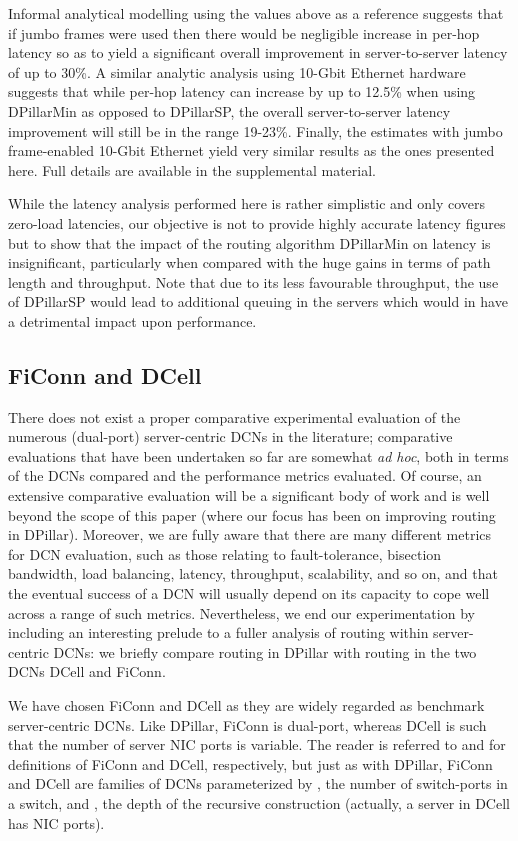 \documentclass{article}
\newcounter{fig}
\begin{document}
Informal analytical modelling using the values above as a reference suggests that if jumbo frames were used then there would be negligible increase in per-hop latency so as to yield a significant overall improvement in server-to-server latency of up to 30\%. A similar analytic analysis using 10-Gbit Ethernet hardware suggests that while per-hop latency can increase by up to 12.5\% when using DPillarMin as opposed to DPillarSP, the overall server-to-server latency improvement will still be in the range 19-23\%. Finally, the estimates with jumbo frame-enabled 10-Gbit Ethernet yield very similar results as the ones presented here. Full details are available in the supplemental material.

While the latency analysis performed here is rather simplistic and only covers zero-load latencies, our objective is not to provide highly accurate latency figures but to show that the impact of the routing algorithm DPillarMin on latency is insignificant, particularly when compared with the huge gains in terms of path length and throughput. Note that due to its less favourable throughput, the use of DPillarSP would lead to additional queuing in the servers which would in have a detrimental impact upon performance.

\subsection{FiConn and DCell}

There does not exist a proper comparative experimental evaluation of the numerous (dual-port) server-centric DCNs in the literature; comparative evaluations that have been undertaken so far are somewhat \emph{ad hoc}, both in terms of the DCNs compared and the performance metrics evaluated. Of course, an extensive comparative evaluation will be a significant body of work and is well beyond the scope of this paper (where our focus has been on improving routing in DPillar). Moreover, we are fully aware that there are many different metrics for DCN evaluation, such as those relating to fault-tolerance, bisection bandwidth, load balancing, latency, throughput, scalability, and so on, and that the eventual success of a DCN will usually depend on its capacity to cope well across a range of such metrics. Nevertheless, we end our experimentation by including an interesting prelude to a fuller analysis of routing within server-centric DCNs: we briefly compare routing in DPillar with routing in the two DCNs DCell and FiConn.

We have chosen FiConn and DCell as they are widely regarded as benchmark server-centric DCNs. Like DPillar, FiConn is  dual-port, whereas DCell is such that the number of server NIC ports is variable. The reader is referred to \cite{LGW09} and \cite{GWT08} for definitions of FiConn and DCell, respectively, but just as with DPillar, FiConn and DCell are families of DCNs parameterized by , the number of switch-ports in a switch, and , the depth of the recursive construction (actually, a server in DCell has  NIC ports).
\end{document}
